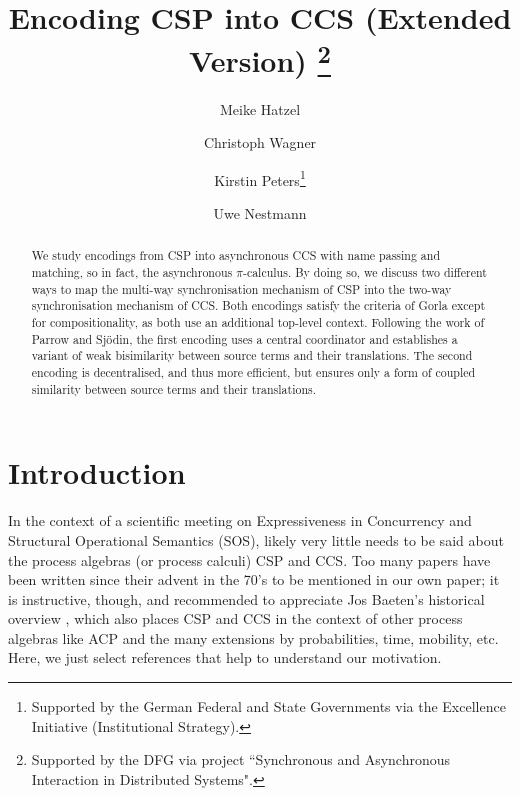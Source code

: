 \documentclass[]{eptcs}
\title{Encoding CSP into CCS (Extended Version)
	\thanks{Supported by the DFG via project ``Synchronous and Asynchronous Interaction in Distributed Systems".}}
\author{Meike Hatzel 
	\institute{TU Berlin}
	\and Christoph Wagner
	\institute{TU Berlin}
	\and Kirstin Peters\thanks{Supported by the German Federal and State Governments via the Excellence Initiative (Institutional Strategy).}
	\institute{TU Dresden}
	\and Uwe Nestmann
	\institute{TU Berlin}
}
\begin{document}
\maketitle

\begin{abstract}
	We study encodings from CSP into asynchronous CCS with name passing and matching, so in fact, the asynchronous $\pi$-calculus. By doing so, we discuss two different ways to map the multi-way synchronisation mechanism of CSP into the two-way synchronisation mechanism of CCS. Both encodings satisfy the criteria of Gorla except for compositionality, as both use an additional top-level context. Following the work of Parrow and Sjödin, the first encoding uses a central coordinator and establishes a variant of weak bisimilarity between source terms and their translations. The second encoding is decentralised, and thus more efficient, but ensures only a form of coupled similarity between source terms and their translations.
\end{abstract}


\section{Introduction}

In the context of a scientific meeting on Expressiveness in Concurrency and Structural Operational Semantics (SOS), likely very little needs to be said about the process algebras (or process calculi) CSP and CCS. Too many papers have been written since their advent in the 70's to be mentioned in our own paper; it is instructive, though, and recommended to appreciate Jos Baeten's historical overview \cite{Baeten:2005:BHP:1085667.1085669}, which also places CSP and CCS in the context of other process algebras like ACP and the many extensions by probabilities, time, mobility, etc. Here, we just select references that help to understand our motivation.
\end{document}
